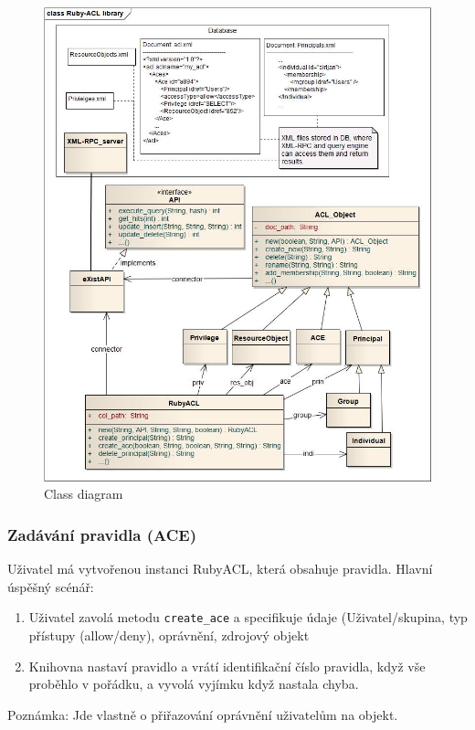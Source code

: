\begin{figure}
\includegraphics[width=15cm]{Ruby-ACL.jpg}
\caption{Class diagram}
\label{fig:Class diagram}
\end{figure}


\subsubsection{Zadávání pravidla (ACE)}
Uživatel má vytvořenou instanci RubyACL, která obsahuje pravidla.
Hlavní úspěšný scénář:
\begin{enumerate}
\item Uživatel zavolá metodu \verb|create_ace| a specifikuje údaje (Uživatel/skupina, typ přístupy (allow/deny), oprávnění, zdrojový objekt
\item Knihovna nastaví pravidlo a vrátí identifikační číslo pravidla, když vše proběhlo v pořádku, a vyvolá vyjímku když nastala chyba.
\end{enumerate}
Poznámka: Jde vlastně o přiřazování oprávnění uživatelům na objekt.

